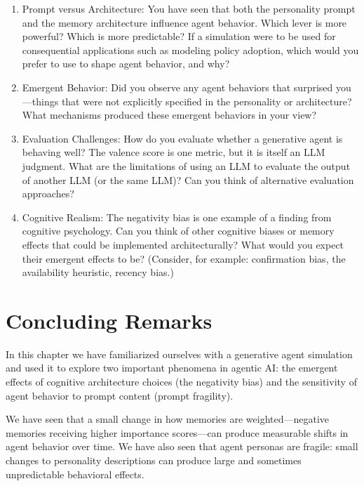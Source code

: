\begin{enumerate}

\item Prompt versus Architecture: You have seen that both the personality prompt and the memory architecture influence agent behavior. Which lever is more powerful? Which is more predictable? If a simulation were to be used for consequential applications such as modeling policy adoption, which would you prefer to use to shape agent behavior, and why?

\item Emergent Behavior: Did you observe any agent behaviors that surprised you---things that were not explicitly specified in the personality or architecture? What mechanisms produced these emergent behaviors in your view?

\item Evaluation Challenges: How do you evaluate whether a generative agent is behaving well? The valence score is one metric, but it is itself an LLM judgment. What are the limitations of using an LLM to evaluate the output of another LLM (or the same LLM)? Can you think of alternative evaluation approaches?

\item Cognitive Realism: The negativity bias is one example of a finding from cognitive psychology. Can you think of other cognitive biases or memory effects that could be implemented architecturally? What would you expect their emergent effects to be? (Consider, for example: confirmation bias, the availability heuristic, recency bias.)

\end{enumerate}

\section{Concluding Remarks}

In this chapter we have familiarized ourselves with a generative agent simulation and used it to explore two important phenomena in agentic AI: the emergent effects of cognitive architecture choices (the negativity bias) and the sensitivity of agent behavior to prompt content (prompt fragility).

We have seen that a small change in how memories are weighted---negative memories receiving higher importance scores---can produce measurable shifts in agent behavior over time. We have also seen that agent personas are fragile: small changes to personality descriptions can produce large and sometimes unpredictable behavioral effects.

